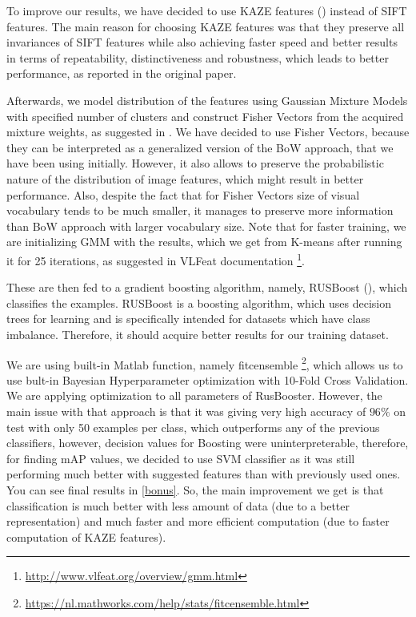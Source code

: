 \documentclass{article}
\begin{document}
To improve our results, we have decided to use KAZE features (\cite{KAZE}) instead of SIFT features. The main reason for choosing KAZE features was that they preserve all invariances of SIFT features while also achieving faster speed and better results in terms of repeatability, distinctiveness and robustness, which leads to better performance, as reported in the original paper. 

Afterwards, we model distribution of the features using Gaussian Mixture Models with specified number of clusters and construct Fisher Vectors from the acquired mixture weights, as suggested in \cite{fisher}. We have decided to use Fisher Vectors, because they can be interpreted as a generalized version of the BoW approach, that we have been using initially. However, it also allows to preserve the probabilistic nature of the distribution of image features, which might result in better performance. Also, despite the fact that for Fisher Vectors size of visual vocabulary tends to be much smaller, it manages to preserve more information than BoW approach with larger vocabulary size. Note that for faster training, we are initializing GMM with the results, which we get from K-means after running it for 25 iterations, as suggested in VLFeat documentation \footnote{\url{http://www.vlfeat.org/overview/gmm.html}}. 

These are then fed to a gradient boosting algorithm, namely, RUSBoost (\cite{RUSBoost}), which classifies the examples. RUSBoost is a boosting algorithm, which uses decision trees for learning and is specifically intended for datasets which have class imbalance. Therefore, it should acquire better results for our training dataset.

We are using built-in Matlab function, namely fitcensemble \footnote{\url{https://nl.mathworks.com/help/stats/fitcensemble.html}}, which allows us to use bult-in Bayesian Hyperparameter optimization with 10-Fold Cross Validation. We are applying optimization to all parameters of RusBooster. However, the main issue with that approach is that it was giving very high accuracy of $96\%$ on test with only 50 examples per class, which outperforms any of the previous classifiers, however, decision values for Boosting were uninterpreterable, therefore, for finding mAP values, we decided to use SVM classifier as it was still performing much better with suggested features than with previously used ones. You can see final results in \cref{bonus}. 
So, the main improvement we get is that classification is much better with less amount of data (due to a better representation) and much faster and more efficient computation (due to faster computation of KAZE features).
\end{document}
